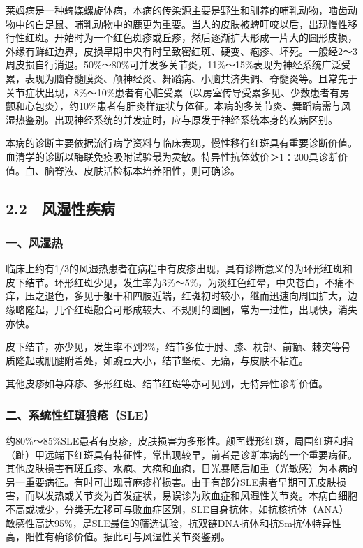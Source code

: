 莱姆病是一种蜱媒螺旋体病，本病的传染源主要是野生和驯养的哺乳动物，啮齿动物中的白足鼠、哺乳动物中的鹿更为重要。当人的皮肤被蜱叮咬以后，出现慢性移行性红斑。开始时为一个红色斑疹或丘疹，然后逐渐扩大形成一片大的圆形皮损，外缘有鲜红边界，皮损早期中央有时呈致密红斑、硬变、疱疹、坏死。一般经2～3周皮损自行消退。50\%～80\%可并发多关节炎，11\%～15\%表现为神经系统广泛受累，表现为脑脊髓膜炎、颅神经炎、舞蹈病、小脑共济失调、脊髓炎等。且常先于关节症状出现，8\%～10\%患者有心脏受累（以房室传导受累多见、少数患者有房颤和心包炎），约10\%患者有肝炎样症状与体征。本病的多关节炎、舞蹈病需与风湿热鉴别。出现神经系统的并发症时，应与原发于神经系统本身的疾病区别。

本病的诊断主要依据流行病学资料与临床表现，慢性移行红斑具有重要诊断价值。血清学的诊断以酶联免疫吸附试验最为灵敏。特异性抗体效价＞1∶200具诊断价值。血、脑脊液、皮肤活检标本培养阳性，则可确诊。

\protect\hypertarget{text00022.html}{}{}

\subsection{2.2　风湿性疾病}

\subsubsection{一、风湿热}

临床上约有1/3的风湿热患者在病程中有皮疹出现，具有诊断意义的为环形红斑和皮下结节。环形红斑少见，发生率为3\%～5\%，为淡红色红晕，中央苍白，不痛不痒，压之退色，多见于躯干和四肢近端，红斑初时较小，继而迅速向周围扩大，边缘略隆起，几个红斑融合可形成较大、不规则的圆圈，常为一过性，出现快，消失亦快。

皮下结节，亦少见，发生率不到2\%，结节多位于肘、膝、枕部、前额、棘突等骨质隆起或肌腱附着处，如豌豆大小，结节坚硬、无痛，与皮肤不粘连。

其他皮疹如荨麻疹、多形红斑、结节红斑等亦可见到，无特异性诊断价值。

\subsubsection{二、系统性红斑狼疮（SLE）}

约80\%～85\%SLE患者有皮疹，皮肤损害为多形性。颜面蝶形红斑，周围红斑和指（趾）甲远端下红斑具有特征性，常出现较早，前者是诊断本病的一个重要病征。其他皮肤损害有斑丘疹、水疱、大疱和血疱，日光暴晒后加重（光敏感）为本病的另一重要病征。有时可出现荨麻疹样损害。由于有部分SLE患者早期可无皮肤损害，而以发热或关节炎为首发症状，易误诊为败血症和风湿性关节炎。本病白细胞不高或减少，分类无左移可与败血症区别，SLE自身抗体，如抗核抗体（ANA）敏感性高达95\%，是SLE最佳的筛选试验，抗双链DNA抗体和抗Sm抗体特异性高，阳性有确诊价值。据此可与风湿性关节炎鉴别。

